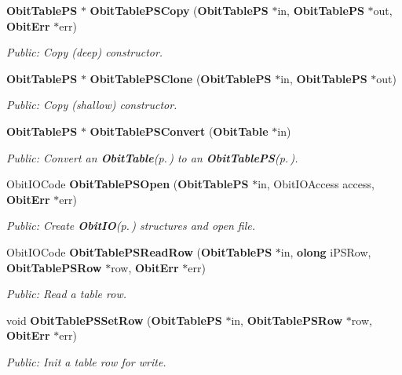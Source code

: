 \begin{CompactItemize}
{\bf Obit\-Table\-PS} $\ast$ {\bf Obit\-Table\-PSCopy} ({\bf Obit\-Table\-PS} $\ast$in, {\bf Obit\-Table\-PS} $\ast$out, {\bf Obit\-Err} $\ast$err)
\begin{CompactList}\small\item\em Public: Copy (deep) constructor. \item\end{CompactList}\item 
{\bf Obit\-Table\-PS} $\ast$ {\bf Obit\-Table\-PSClone} ({\bf Obit\-Table\-PS} $\ast$in, {\bf Obit\-Table\-PS} $\ast$out)
\begin{CompactList}\small\item\em Public: Copy (shallow) constructor. \item\end{CompactList}\item 
{\bf Obit\-Table\-PS} $\ast$ {\bf Obit\-Table\-PSConvert} ({\bf Obit\-Table} $\ast$in)
\begin{CompactList}\small\item\em Public: Convert an {\bf Obit\-Table}{\rm (p.\,\pageref{structObitTable})} to an {\bf Obit\-Table\-PS}{\rm (p.\,\pageref{structObitTablePS})}. \item\end{CompactList}\item 
Obit\-IOCode {\bf Obit\-Table\-PSOpen} ({\bf Obit\-Table\-PS} $\ast$in, Obit\-IOAccess access, {\bf Obit\-Err} $\ast$err)
\begin{CompactList}\small\item\em Public: Create {\bf Obit\-IO}{\rm (p.\,\pageref{structObitIO})} structures and open file. \item\end{CompactList}\item 
Obit\-IOCode {\bf Obit\-Table\-PSRead\-Row} ({\bf Obit\-Table\-PS} $\ast$in, {\bf olong} i\-PSRow, {\bf Obit\-Table\-PSRow} $\ast$row, {\bf Obit\-Err} $\ast$err)
\begin{CompactList}\small\item\em Public: Read a table row. \item\end{CompactList}\item 
void {\bf Obit\-Table\-PSSet\-Row} ({\bf Obit\-Table\-PS} $\ast$in, {\bf Obit\-Table\-PSRow} $\ast$row, {\bf Obit\-Err} $\ast$err)
\begin{CompactList}\small\item\em Public: Init a table row for write. \item\end{CompactList}\item 

\end{CompactItemize}
